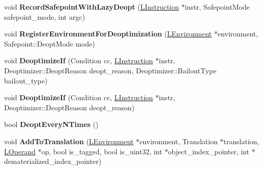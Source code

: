 \begin{DoxyCompactItemize}
\item 
void {\bfseries Record\+Safepoint\+With\+Lazy\+Deopt} (\hyperlink{classv8_1_1internal_1_1_l_instruction}{L\+Instruction} $\ast$instr, Safepoint\+Mode safepoint\+\_\+mode, int argc)\hypertarget{classv8_1_1internal_1_1_l_code_gen_aab8a1cb041780d7e5cb7ddd849856abf}{}\label{classv8_1_1internal_1_1_l_code_gen_aab8a1cb041780d7e5cb7ddd849856abf}

\item 
void {\bfseries Register\+Environment\+For\+Deoptimization} (\hyperlink{classv8_1_1internal_1_1_l_environment}{L\+Environment} $\ast$environment, Safepoint\+::\+Deopt\+Mode mode)\hypertarget{classv8_1_1internal_1_1_l_code_gen_a8e3566b9bf7194223c47e7dac6fd6a10}{}\label{classv8_1_1internal_1_1_l_code_gen_a8e3566b9bf7194223c47e7dac6fd6a10}

\item 
void {\bfseries Deoptimize\+If} (Condition cc, \hyperlink{classv8_1_1internal_1_1_l_instruction}{L\+Instruction} $\ast$instr, Deoptimizer\+::\+Deopt\+Reason deopt\+\_\+reason, Deoptimizer\+::\+Bailout\+Type bailout\+\_\+type)\hypertarget{classv8_1_1internal_1_1_l_code_gen_a9d452933b6c4ab49e99819782c3d3bd2}{}\label{classv8_1_1internal_1_1_l_code_gen_a9d452933b6c4ab49e99819782c3d3bd2}

\item 
void {\bfseries Deoptimize\+If} (Condition cc, \hyperlink{classv8_1_1internal_1_1_l_instruction}{L\+Instruction} $\ast$instr, Deoptimizer\+::\+Deopt\+Reason deopt\+\_\+reason)\hypertarget{classv8_1_1internal_1_1_l_code_gen_ac1bc02d00cc21a8407b9d2832809938c}{}\label{classv8_1_1internal_1_1_l_code_gen_ac1bc02d00cc21a8407b9d2832809938c}

\item 
bool {\bfseries Deopt\+Every\+N\+Times} ()\hypertarget{classv8_1_1internal_1_1_l_code_gen_a2fde56b4e76b315c3b53cf919409d719}{}\label{classv8_1_1internal_1_1_l_code_gen_a2fde56b4e76b315c3b53cf919409d719}

\item 
void {\bfseries Add\+To\+Translation} (\hyperlink{classv8_1_1internal_1_1_l_environment}{L\+Environment} $\ast$environment, Translation $\ast$translation, \hyperlink{classv8_1_1internal_1_1_l_operand}{L\+Operand} $\ast$op, bool is\+\_\+tagged, bool is\+\_\+uint32, int $\ast$object\+\_\+index\+\_\+pointer, int $\ast$dematerialized\+\_\+index\+\_\+pointer)\hypertarget{classv8_1_1internal_1_1_l_code_gen_a418f466c19b6671a29663f4378a36d8c}{}\label{classv8_1_1internal_1_1_l_code_gen_a418f466c19b6671a29663f4378a36d8c}


\end{DoxyCompactItemize}

